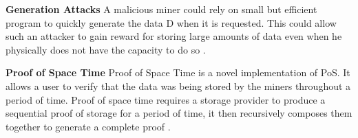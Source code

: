 \textbf{Generation Attacks}
A malicious miner could rely on small but efficient program to quickly generate the data D when it is requested. This could allow such an attacker to gain reward for storing large amounts of data even when he physically does not have the capacity to do so \cite{paper:007}.

\textbf{Proof of Space Time}
Proof of Space Time is a novel implementation of PoS. It allows a user to verify that the data was being stored by the miners throughout a period of time. Proof of space time requires a storage provider to produce a sequential proof of storage for a period of time, it then recursively composes them together to generate a complete proof \cite{paper:007}.






